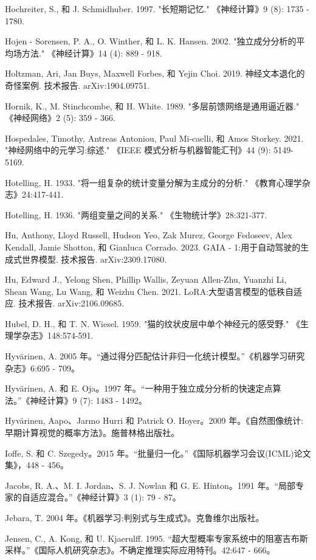 \documentclass[10pt]{article}
\begin{document}
Hochreiter, S., 和 J. Schmidhuber. 1997. "长短期记忆." 《神经计算》9 (8): 1735 - 1780.

Hojen - Sorensen, P. A., O. Winther, 和 L. K. Hansen. 2002. "独立成分分析的平均场方法." 《神经计算》14 (4): 889 - 918.

Holtzman, Ari, Jan Buys, Maxwell Forbes, 和 Yejin Choi. 2019. 神经文本退化的奇怪案例. 技术报告. arXiv:1904.09751.

Hornik, K., M. Stinchcombe, 和 H. White. 1989. "多层前馈网络是通用逼近器." 《神经网络》2 (5): 359 - 366.

Hospedales, Timothy, Antreas Antoniou, Paul Mi-caelli, 和 Amos Storkey. 2021. "神经网络中的元学习:综述." 《IEEE 模式分析与机器智能汇刊》44 (9): 5149-5169.

Hotelling, H. 1933. "将一组复杂的统计变量分解为主成分的分析." 《教育心理学杂志》24:417-441.

Hotelling, H. 1936. "两组变量之间的关系." 《生物统计学》28:321-377.

Hu, Anthony, Lloyd Russell, Hudson Yeo, Zak Murez, George Fedoseev, Alex Kendall, Jamie Shotton, 和 Gianluca Corrado. 2023. GAIA - 1:用于自动驾驶的生成式世界模型. 技术报告. arXiv:2309.17080.

Hu, Edward J., Yelong Shen, Phillip Wallis, Zeyuan Allen-Zhu, Yuanzhi Li, Shean Wang, Lu Wang, 和 Weizhu Chen. 2021. LoRA:大型语言模型的低秩自适应. 技术报告. arXiv:2106.09685.

Hubel, D. H., 和 T. N. Wiesel. 1959. "猫的纹状皮层中单个神经元的感受野." 《生理学杂志》148:574-591.

Hyvärinen, A. 2005 年。“通过得分匹配估计非归一化统计模型。”《机器学习研究杂志》6:695 - 709。

Hyvärinen, A. 和 E. Oja。1997 年。“一种用于独立成分分析的快速定点算法。”《神经计算》9 (7): 1483 - 1492。

Hyvärinen, Aapo、Jarmo Hurri 和 Patrick O. Hoyer。2009 年。《自然图像统计:早期计算视觉的概率方法》。施普林格出版社。

Ioffe, S. 和 C. Szegedy。2015 年。“批量归一化。”《国际机器学习会议(ICML)论文集》，448 - 456。

Jacobs, R. A.、M. I. Jordan、S. J. Nowlan 和 G. E. Hinton。1991 年。“局部专家的自适应混合。”《神经计算》3 (1): 79 - 87。

Jebara, T. 2004 年。《机器学习:判别式与生成式》。克鲁维尔出版社。

Jensen, C., A. Kong, 和 U. Kjaerulff. 1995. “超大型概率专家系统中的阻塞吉布斯采样。”《国际人机研究杂志》。不确定推理实际应用特刊。42:647 - 666。
\end{document}
